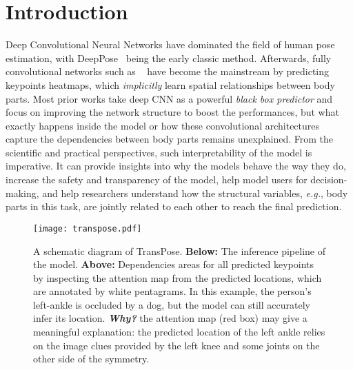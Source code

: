 \documentclass{article}
\begin{document}
\section{Introduction}
Deep Convolutional Neural Networks have dominated the field of human pose estimation, with DeepPose~\cite{toshev2014deeppose} being the early classic method. Afterwards, fully convolutional networks such as ~\cite{wei2016convolutional,long2015fully, wei2016convolutional, newell2016stacked,yang2017learning,chen2018cascaded,papandreou2018PersonLabPP,xiao2018simple,sun2019hrnet} have become the mainstream by predicting keypoints heatmaps, which \emph{implicitly} learn spatial relationships between body parts. Most prior works take deep CNN as a powerful \emph{black box predictor} and focus on improving the network structure to boost the performances, but what exactly happens inside the model or how these convolutional architectures capture the dependencies between body parts remains unexplained. From the scientific and practical perspectives, such interpretability of the model is imperative. It can provide insights into why the models behave the way they do, increase the safety and transparency of the model, help model users for decision-making, and help researchers understand how the structural variables, \emph{e.g.}, body parts in this task, are jointly related to each other to reach the final prediction. 
\begin{figure}[t]
	\begin{center}
\texttt{[image: transpose.pdf]}
	\end{center}
	\caption{A schematic diagram of TransPose. \textbf{Below:} The inference pipeline of the model. \textbf{Above:} Dependencies areas for all predicted keypoints by inspecting the attention map from the predicted locations, which are annotated by white pentagrams. In this example, the person's left-ankle is occluded by a dog, but the model can still accurately infer its location. \textbf{\emph{Why?}} the attention map (red box) may give a meaningful explanation: the predicted location of the left ankle relies on the image clues provided by the left knee and some joints on the other side of the symmetry.}\vspace*{-0.1in}
	\label{beginning fig}
\end{figure}
\end{document}

